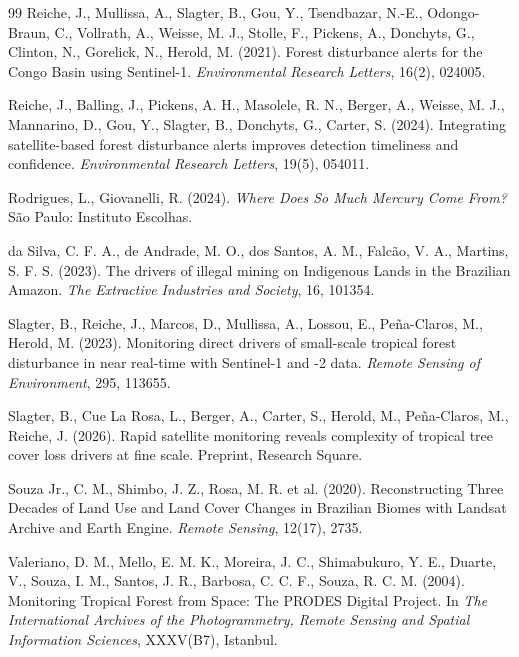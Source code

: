 \documentclass[11pt]{article}
\begin{document}
\begin{thebibliography}{99}
Reiche, J., Mullissa, A., Slagter, B., Gou, Y., Tsendbazar, N.-E., Odongo-Braun, C., Vollrath, A., Weisse, M. J., Stolle, F., Pickens, A., Donchyts, G., Clinton, N., Gorelick, N., Herold, M. (2021).
Forest disturbance alerts for the Congo Basin using Sentinel-1.
\textit{Environmental Research Letters}, 16(2), 024005.

Reiche, J., Balling, J., Pickens, A. H., Masolele, R. N., Berger, A., Weisse, M. J., Mannarino, D., Gou, Y., Slagter, B., Donchyts, G., Carter, S. (2024).
Integrating satellite-based forest disturbance alerts improves detection timeliness and confidence.
\textit{Environmental Research Letters}, 19(5), 054011.

Rodrigues, L., Giovanelli, R. (2024).
\textit{Where Does So Much Mercury Come From?}
S\~ao Paulo: Instituto Escolhas.

da Silva, C. F. A., de Andrade, M. O., dos Santos, A. M., Falc\~ao, V. A., Martins, S. F. S. (2023).
The drivers of illegal mining on Indigenous Lands in the Brazilian Amazon.
\textit{The Extractive Industries and Society}, 16, 101354.

Slagter, B., Reiche, J., Marcos, D., Mullissa, A., Lossou, E., Pe\~na-Claros, M., Herold, M. (2023).
Monitoring direct drivers of small-scale tropical forest disturbance in near real-time with Sentinel-1 and -2 data.
\textit{Remote Sensing of Environment}, 295, 113655.

Slagter, B., Cue La Rosa, L., Berger, A., Carter, S., Herold, M., Pe\~na-Claros, M., Reiche, J. (2026).
Rapid satellite monitoring reveals complexity of tropical tree cover loss drivers at fine scale.
Preprint, Research Square.

Souza Jr., C. M., Shimbo, J. Z., Rosa, M. R. et al. (2020).
Reconstructing Three Decades of Land Use and Land Cover Changes in Brazilian Biomes with Landsat Archive and Earth Engine.
\textit{Remote Sensing}, 12(17), 2735.

Valeriano, D. M., Mello, E. M. K., Moreira, J. C., Shimabukuro, Y. E., Duarte, V., Souza, I. M., Santos, J. R., Barbosa, C. C. F., Souza, R. C. M. (2004).
Monitoring Tropical Forest from Space: The PRODES Digital Project.
In \textit{The International Archives of the Photogrammetry, Remote Sensing and Spatial Information Sciences}, XXXV(B7), Istanbul.


\end{thebibliography}
\end{document}
